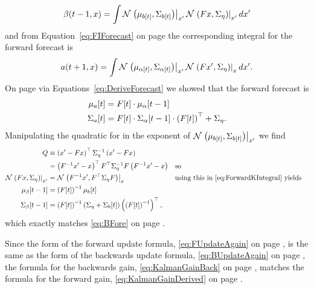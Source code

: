 \begin{enumerate}
\begin{equation}
      \label{eq:BackwardKIntrgral}
      \beta(t-1,x) = \int
      {\mathcal{N}}\left.\left(\mu_{{b}{[t]}},\Sigma_{{b}{[t]}}\right)\right|_{x'}
      {\mathcal{N}}\left.\left(Fx,\Sigma_\eta\right)\right|_{x'} dx'
    \end{equation}
    and from Equation~\eqref{eq:FIForecast} on page
    \pageref{eq:FIForecast} the corresponding integral for the forward
    forecast is
    \begin{equation}
      \label{eq:ForwardKIntegral}
      a(t+1,x) = \int
      {\mathcal{N}}\left.\left(\mu_{{\alpha}{[t]}},\Sigma_{{\alpha}{[t]}}\right)\right|_{x'}
      {\mathcal{N}}\left.\left(Fx',\Sigma_\eta\right)\right|_{x} dx'.
    \end{equation}
    On page \pageref{eq:DeriveForecast} via
    Equations~\eqref{eq:DeriveForecast} we showed that the forward
    forecast is
    \begin{align*}
      {\mu_a}{[t]} &= {F}{[t]} \cdot {\mu_\alpha}{[t-1]}\\
      {\Sigma_a}{[t]} &= {F}{[t]} \cdot {\Sigma_\alpha}{[t-1]}
      \cdot \left({F}{[t]}\right)^\top + \Sigma_\eta.
    \end{align*}
    Manipulating the quadratic for in the exponent of
    ${\mathcal{N}}\left.\left(\mu_{{b}{[t]}},\Sigma_{{b}{[t]}}\right)\right|_{x'}$ we find
    \begin{align*}
      Q
      &\equiv \left(x'-Fx\right)^\top \Sigma^{-1}_\eta
        \left(x'-Fx\right) \\
      &= \left(F^{-1}x'- x\right)^\top F^\top
        \Sigma^{-1}_\eta F \left(F^{-1}x'-x\right)  && \text{so} \\
      {\mathcal{N}}\left.\left(Fx,\Sigma_\eta\right)\right|_{x'}
      &= {\mathcal{N}}\left.\left(F^{-1}x',F^\top\Sigma_\eta F\right)\right|_{x}  &&
                                                             \text{using
                                                             this in
                                                             \eqref{eq:ForwardKIntegral}
                                                             yields}
      \\
      {\mu_\beta}{[t-1]} &= \left( {F}{[t]} \right)^{-1}
      {\mu_b}{[t]} \\
      {\Sigma_\beta}{[t-1]} &= \left( {F}{[t]} \right)^{-1} \left(
        \Sigma_\eta + {\Sigma_b}{[t]} \right) \left( \left( {F}{[t]}
        \right)^{-1} \right)^\top,
    \end{align*}
    which exactly matches \eqref{eq:BFore} on page \pageref{eq:BFore}.
  \end{enumerate}

  Since the form of the forward update formula,
  \eqref{eq:FUpdateAgain} on page \pageref{eq:FUpdateAgain}, is the
  same as the form of the backwards update formula,
  \eqref{eq:BUpdateAgain} on page \pageref{eq:BUpdateAgain}, the
  formula for the backwards gain, \eqref{eq:KalmanGainBack} on page
  \pageref{eq:KalmanGainBack}, matches the formula for the forward
  gain, \eqref{eq:KalmanGainDerived} on page
  \pageref{eq:KalmanGainDerived}.

